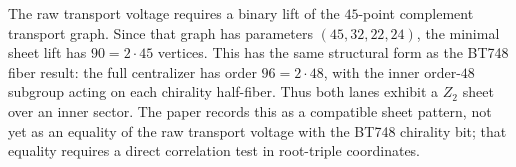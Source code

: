 
\makeatletter
{}
\makeatother
\providecommand{\PSp}{\mathrm{PSp}}
\providecommand{\Aut}{\mathrm{Aut}}
\providecommand{\spec}{\operatorname{spec}}


\begin{remark}[The missing sheet coordinate and the $96=2\cdot48$ split]
\label{rem:z2-cover-centralizer96}
The raw transport voltage requires a binary lift of the $45$-point complement
transport graph.  Since that graph has parameters $(45,32,22,24)$, the minimal
sheet lift has $90=2\cdot45$ vertices.  This has the same structural form as the
BT748 fiber result: the full centralizer has order $96=2\cdot48$, with the
inner order-$48$ subgroup acting on each chirality half-fiber.  Thus both lanes
exhibit a $Z_2$ sheet over an inner sector.  The paper records this as a
compatible sheet pattern, not yet as an equality of the raw transport voltage
with the BT748 chirality bit; that equality requires a direct correlation test in
root-triple coordinates.
\end{remark}
